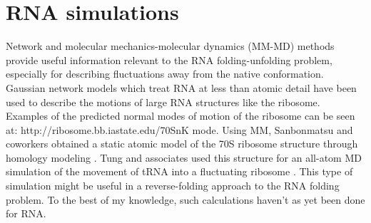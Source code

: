 \section{RNA simulations}
Network and molecular mechanics-molecular dynamics (MM-MD) methods
provide useful information relevant to the RNA folding-unfolding
problem, especially for describing fluctuations away from the native
conformation. Gaussian network models \cite{y_wang2004, bahar1998,
wang2005} which treat RNA at less than atomic detail have been used
to describe the motions of large RNA structures like the ribosome.
Examples of the predicted normal modes of motion of the ribosome can
be seen at: http://ribosome.bb.iastate.edu/70SnK mode. Using MM,
Sanbonmatsu and coworkers obtained a static atomic model of the 70S
ribosome structure through homology modeling \cite{tung2004}. Tung and
associates used this structure for an all-atom MD simulation of the
movement of tRNA into a fluctuating ribosome \cite{sanbonmatsu2005}.
This type of simulation might be useful in a reverse-folding
approach to the RNA folding problem. To the best of my knowledge,
such calculations haven't as yet been done for RNA.

